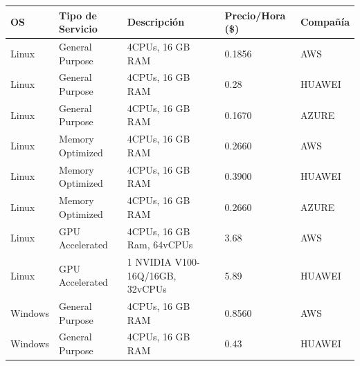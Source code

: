 \documentclass[12pt,a4paper,openright]{article}
\begin{document}
\begin{table}[ht]
\begin{adjustbox}{width=\textwidth}
\begin{tabular}{|l|l|l|l|l|}\hline
\textbf{OS} & \textbf{Tipo de Servicio} & \textbf{Descripci\'on} & \textbf{Precio/Hora (\$)}            & \textbf{Compañía} \\ \hline \hline
Linux                        & General Purpose                            & 4CPUs, 16 GB RAM                      & 0.1856                                                & AWS                                \\ \hline
Linux                        & General Purpose                            & 4CPUs, 16 GB RAM                      & 0.28                                                  & HUAWEI                             \\ \hline
Linux                        & General Purpose                            & 4CPUs, 16 GB RAM                      & 0.1670                                                &  AZURE                                    \\ \hline
Linux                        & Memory Optimized                           & 4CPUs, 16 GB RAM                      &  0.2660 & AWS                                \\ \hline
Linux                        & Memory Optimized                           & 4CPUs, 16 GB RAM                      & 0.3900                                                & HUAWEI                             \\ \hline
Linux                        & Memory Optimized                           & 4CPUs, 16 GB RAM                      &  0.2660 &  AZURE      \\ \hline
Linux                        & GPU Accelerated                            & 4CPUs, 16 GB Ram, 64vCPUs             & 3.68                                                  & AWS                                \\ \hline
Linux                        & GPU Accelerated                            & 1 NVIDIA V100-16Q/16GB, 32vCPUs       & 5.89                                                  & HUAWEI                             \\ \hline
Windows                      & General Purpose                            & 4CPUs, 16 GB RAM                      & 0.8560                                                & AWS                                \\ \hline
Windows                      & General Purpose                            & 4CPUs, 16 GB RAM                      & 0.43                                                  & HUAWEI                             \\ \hline

\end{tabular}
\end{adjustbox}
\end{table}
\end{document}
